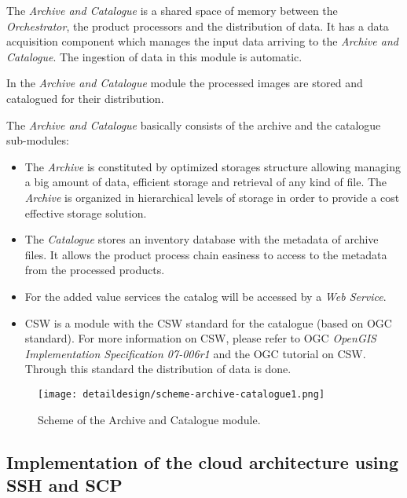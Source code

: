 The \emph{Archive and Catalogue} is a shared space of memory between the
\emph{Orchestrator}, the product processors and the distribution of data. It has
a data acquisition component which manages the input data arriving to the
\emph{Archive and Catalogue}. The ingestion of data in this module is automatic.

In the \emph{Archive and Catalogue} module the processed images are stored and catalogued for their distribution.

The \emph{Archive and Catalogue} basically consists of the archive and the
catalogue sub-modules:
\begin{itemize}
\item The \emph{Archive} is constituted by optimized storages structure allowing managing a big amount of data, efficient storage and retrieval of any kind of file. The \emph{Archive} is organized in hierarchical levels of storage in order to provide a cost effective storage solution.

\item The \emph{Catalogue} stores an inventory database with the metadata of archive files. It allows the product process chain easiness to access to the metadata from the processed products.

\item For the added value services the catalog will be accessed by a \emph{Web Service}.

\item \ac{CSW} is a module with the \ac{CSW} standard for the catalogue (based on \ac{OGC} standard). For more information on \ac{CSW}, please refer to \ac{OGC} \emph{OpenGIS Implementation Specification 07-006r1} and the \ac{OGC} tutorial on \ac{CSW}. Through this standard the distribution of data is done.
\end{itemize}

\begin{figure}[!h]
\begin{center}
\texttt{[image: detaildesign/scheme-archive-catalogue1.png]}
\caption{Scheme of the Archive and Catalogue module.}
\label{fig:archive-catalogue-scheme}
\end{center}
\end{figure}



\subsection{Implementation of the cloud architecture using SSH and SCP}

